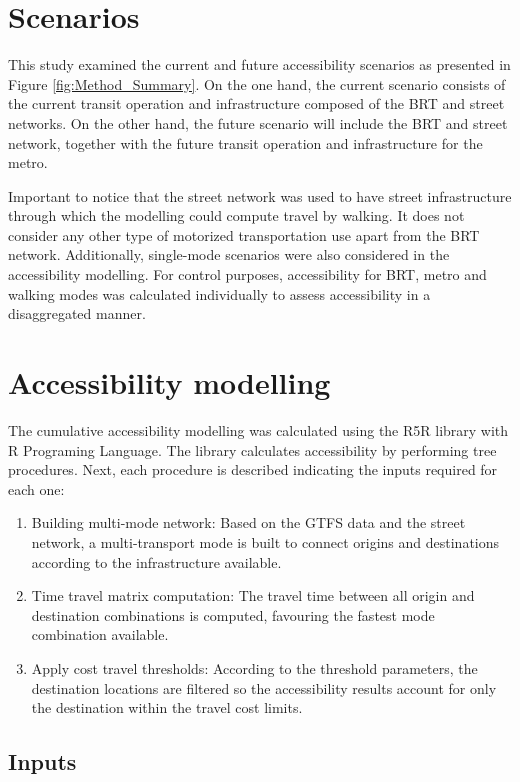 \documentclass[12pt, a4paper]{report}
\begin{document}
\section{Scenarios} \label{Scenarios}

This study examined the current and future accessibility scenarios as presented in Figure \ref{fig:Method_Summary}. On the one hand, the current scenario consists of the current transit operation and infrastructure composed of the BRT and street networks. On the other hand, the future scenario will include the BRT and street network, together with the future transit operation and infrastructure for the metro.

Important to notice that the street network was used to have street infrastructure through which the modelling could compute travel by walking. It does not consider any other type of motorized transportation use apart from the BRT network. Additionally, single-mode scenarios were also considered in the accessibility modelling. For control purposes, accessibility for BRT, metro and walking modes was calculated individually to assess accessibility in a disaggregated manner.

\section{Accessibility modelling}

The cumulative accessibility modelling was calculated using the R5R library with R Programing Language. The library calculates accessibility by performing tree procedures. Next, each procedure is described indicating the inputs required for each one:

\begin{enumerate}
    \item Building multi-mode network: Based on the GTFS data and the street network, a multi-transport mode is built to connect origins and destinations according to the infrastructure available.
    \item Time travel matrix computation: The travel time between all origin and destination combinations is computed, favouring the fastest mode combination available.
    \item Apply cost travel thresholds: According to the threshold parameters, the destination locations are filtered so the accessibility results account for only the destination within the travel cost limits.
\end{enumerate}


\subsection{Inputs} \label{Inputs}
\end{document}
